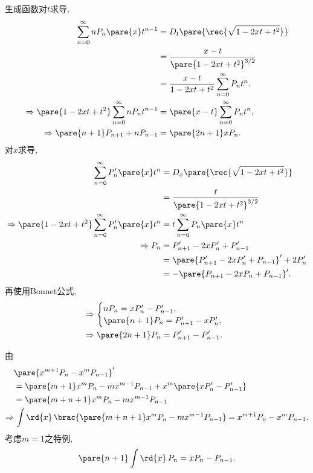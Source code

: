 \documentclass[hidelinks]{ctexart}
\begin{document}
生成函数对$t$求导,
\begin{align*}
    \sum_{n=0}^\infty nP_n\pare{x} t^{n-1} &= D_t \pare{\rec{\sqrt{1-2xt + t^2}}} \\
    &= \frac{x-t}{\pare{1-2xt+t^2}^{3/2}} \\
    &= \frac{x-t}{1-2xt+t^2}\sum_{n=0}^\infty P_n t^n.\\
    \Rightarrow \pare{1-2xt + t^2}\sum_{n=0}^\infty nP_n t^{n-1} &= \pare{x-t}\sum_{n=0}^\infty P_n t^n, \\
    \Rightarrow \pare{n+1}P_{n+1} + nP_{n-1} &= \pare{2n+1}xP_n.
\end{align*}
对$x$求导,
\begin{align*}
    \sum_{n=0}^\infty P'_n\pare{x} t^n &= D_x\pare{\rec{\sqrt{1-2xt+t^2}}} \\
    &= \frac{t}{\pare{1-2xt+t^2}^{3/2}} \\
    \Rightarrow \pare{1-2xt+t^2}\sum_{n=0}^\infty P'_n\pare{x}t^n &= t\sum_{n=0}^\infty P_n\pare{x}t^n \\
    \Rightarrow P_n &= P'_{n+1} - 2xP'_n + P'_{n-1} \\
    &= \pare{P'_{n+1} - 2xP'_n + P_{n-1}}' + 2P_n'\\
    &= -\pare{P_{n+1} - 2xP_n + P_{n-1}}'.
\end{align*}
再使用Bonnet公式,
\begin{align*}
    & \Rightarrow \begin{cases}
        nP_n = xP'_n - P'_{n-1}, \\
        \pare{n+1}P_n = P'_{n+1} - xP'_n,
    \end{cases}\\
    & \Rightarrow  \pare{2n+1}P_n = P'_{n+1} - P'_{n-1}.
\end{align*}
\begin{sample}
    \begin{ex}
        由
        \begin{align*}
            &\pare{x^{m+1}P_n - x^mP_{n-1}}' \\
            &= \pare{m+1} x^m P_n - mx^{m-1} P_{n-1} + x^m\pare{xP'_n - P'_{n-1}} \\
            &= \pare{m+n+1} x^m P_n - mx^{m-1}P_{n-1} \\
            \Rightarrow &\, \int\rd{x}\,\brac{\pare{m+n+1}x^m P_n - mx^{m-1}P_{n-1}} = x^{m+1}P_n - x^mP_{n-1}.
        \end{align*}
        考虑$m=1$之特例,
        \[ \pare{n+1}\int\rd{x}\, P_n = xP_n - P_{n-1}. \]
    \end{ex}
\end{sample}
\end{document}
